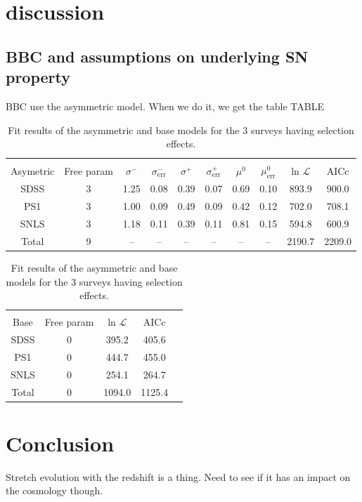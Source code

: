 \documentclass[]{aa} %
\begin{document}
\section{discussion}

\subsection{BBC and assumptions on underlying SN property}
\label{sec:bbc}
BBC use the asymmetric model. When we do it, we get the table TABLE

\begin{table}
    \centering
    \caption{Fit results of the asymmetric and base models for the 3 surveys
    having selection effects.}
    \label{tab:bbc}
    \begin{tabular}{c c c c c c c c c c}\hline\hline\\[-0.8em]
    Asymetric & Free param & $\sigma^-$ & $\sigma^-_{\mathrm{err}}$ &
    $\sigma^+$ & $\sigma^+_{\mathrm{err}}$ & $\mu^0$ & $\mu^0_{\mathrm{err}}$
               & ln $\mathcal{L}$ & AICc \\\hline
    SDSS & 3 & 1.25 & 0.08 & 0.39 & 0.07 & 0.69 & 0.10 & 893.9 & 900.0 \\
    PS1 & 3 & 1.00 & 0.09 & 0.49 & 0.09 & 0.42 & 0.12 & 702.0 & 708.1 \\
    SNLS & 3 & 1.18 & 0.11 & 0.39 & 0.11 & 0.81 & 0.15 & 594.8 & 600.9 \\\hline
    Total & 9 & -- & -- & -- & -- & -- & -- & 2190.7 & 2209.0\\\hline
    \end{tabular}
    
    \vspace*{12pt}
    
    \begin{tabular}{c c c c c}\hline\hline\\[-0.8em]
    Base &  Free param & ln $\mathcal{L}$ & AICc \\\hline
    SDSS & 0 & 395.2 & 405.6 \\
    PS1 & 0 & 444.7 & 455.0 \\
    SNLS & 0 & 254.1 & 264.7 \\\hline
    Total & 0 & 1094.0 & 1125.4 \\\hline
    \end{tabular}
\end{table}

\section{Conclusion}
\label{sec:ccl}
Stretch evolution with the redshift is a thing. Need to see if it has an impact
on the cosmology though.
\end{document}

